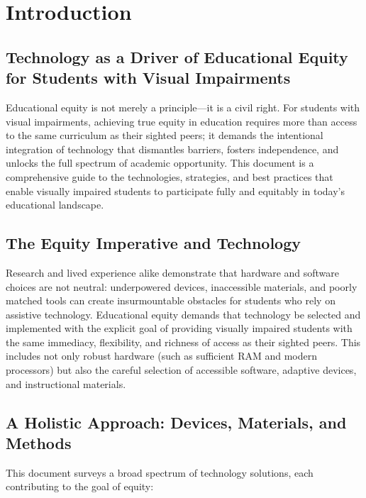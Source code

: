 \chapter*{Introduction}\label{intro}

\section{Technology as a Driver of Educational Equity for Students with Visual Impairments}
\label{sec:intro-tech-equity}

Educational equity is not merely a principle—it is a civil right. For students with visual impairments, achieving true equity in education requires more than access to the same curriculum as their sighted peers; it demands the intentional integration of technology that dismantles barriers, fosters independence, and unlocks the full spectrum of academic opportunity. This document is a comprehensive guide to the technologies, strategies, and best practices that enable visually impaired students to participate fully and equitably in today’s educational landscape.

\section{The Equity Imperative and Technology}
\label{sec:intro-equity-imperative}

Research and lived experience alike demonstrate that hardware and software choices are not neutral: underpowered devices, inaccessible materials, and poorly matched tools can create insurmountable obstacles for students who rely on assistive technology. Educational equity demands that technology be selected and implemented with the explicit goal of providing visually impaired students with the same immediacy, flexibility, and richness of access as their sighted peers. This includes not only robust hardware (such as sufficient RAM and modern processors) but also the careful selection of accessible software, adaptive devices, and instructional materials.

\section{A Holistic Approach: Devices, Materials, and Methods}
\label{sec:intro-holistic-approach}

This document surveys a broad spectrum of technology solutions, each contributing to the goal of equity:

